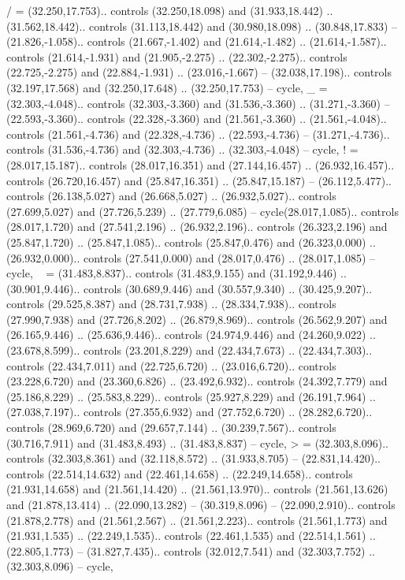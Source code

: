 {/} = {(32.250,17.753).. controls (32.250,18.098) and (31.933,18.442) .. (31.562,18.442).. controls (31.113,18.442) and (30.980,18.098) .. (30.848,17.833) -- (21.826,-1.058).. controls (21.667,-1.402) and (21.614,-1.482) .. (21.614,-1.587).. controls (21.614,-1.931) and (21.905,-2.275) .. (22.302,-2.275).. controls (22.725,-2.275) and (22.884,-1.931) .. (23.016,-1.667) -- (32.038,17.198).. controls (32.197,17.568) and (32.250,17.648) .. (32.250,17.753) -- cycle},
{_} = {(32.303,-4.048).. controls (32.303,-3.360) and (31.536,-3.360) .. (31.271,-3.360) -- (22.593,-3.360).. controls (22.328,-3.360) and (21.561,-3.360) .. (21.561,-4.048).. controls (21.561,-4.736) and (22.328,-4.736) .. (22.593,-4.736) -- (31.271,-4.736).. controls (31.536,-4.736) and (32.303,-4.736) .. (32.303,-4.048) -- cycle},
{!} = {(28.017,15.187).. controls (28.017,16.351) and (27.144,16.457) .. (26.932,16.457).. controls (26.720,16.457) and (25.847,16.351) .. (25.847,15.187) -- (26.112,5.477).. controls (26.138,5.027) and (26.668,5.027) .. (26.932,5.027).. controls (27.699,5.027) and (27.726,5.239) .. (27.779,6.085) -- cycle(28.017,1.085).. controls (28.017,1.720) and (27.541,2.196) .. (26.932,2.196).. controls (26.323,2.196) and (25.847,1.720) .. (25.847,1.085).. controls (25.847,0.476) and (26.323,0.000) .. (26.932,0.000).. controls (27.541,0.000) and (28.017,0.476) .. (28.017,1.085) -- cycle},
{~} = {(31.483,8.837).. controls (31.483,9.155) and (31.192,9.446) .. (30.901,9.446).. controls (30.689,9.446) and (30.557,9.340) .. (30.425,9.207).. controls (29.525,8.387) and (28.731,7.938) .. (28.334,7.938).. controls (27.990,7.938) and (27.726,8.202) .. (26.879,8.969).. controls (26.562,9.207) and (26.165,9.446) .. (25.636,9.446).. controls (24.974,9.446) and (24.260,9.022) .. (23.678,8.599).. controls (23.201,8.229) and (22.434,7.673) .. (22.434,7.303).. controls (22.434,7.011) and (22.725,6.720) .. (23.016,6.720).. controls (23.228,6.720) and (23.360,6.826) .. (23.492,6.932).. controls (24.392,7.779) and (25.186,8.229) .. (25.583,8.229).. controls (25.927,8.229) and (26.191,7.964) .. (27.038,7.197).. controls (27.355,6.932) and (27.752,6.720) .. (28.282,6.720).. controls (28.969,6.720) and (29.657,7.144) .. (30.239,7.567).. controls (30.716,7.911) and (31.483,8.493) .. (31.483,8.837) -- cycle},
{>} = {(32.303,8.096).. controls (32.303,8.361) and (32.118,8.572) .. (31.933,8.705) -- (22.831,14.420).. controls (22.514,14.632) and (22.461,14.658) .. (22.249,14.658).. controls (21.931,14.658) and (21.561,14.420) .. (21.561,13.970).. controls (21.561,13.626) and (21.878,13.414) .. (22.090,13.282) -- (30.319,8.096) -- (22.090,2.910).. controls (21.878,2.778) and (21.561,2.567) .. (21.561,2.223).. controls (21.561,1.773) and (21.931,1.535) .. (22.249,1.535).. controls (22.461,1.535) and (22.514,1.561) .. (22.805,1.773) -- (31.827,7.435).. controls (32.012,7.541) and (32.303,7.752) .. (32.303,8.096) -- cycle},
